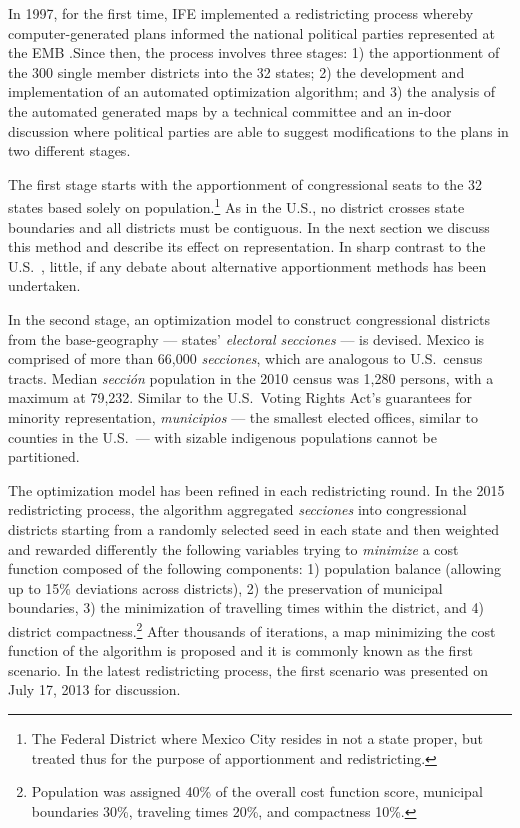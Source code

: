 \documentclass[letter,12pt]{article}
\begin{document}
In 1997, for the first time, IFE implemented a redistricting process whereby computer-generated plans informed the national political parties represented at the EMB \citep{trelles.mtz.tesisItam.2007}.Since then, the process involves three stages: 1) the apportionment of the 300 single member districts into the 32 states; 2) the development and implementation of an automated optimization algorithm; and 3) the analysis of the automated generated maps by a technical committee and an in-door discussion where political parties are able to suggest modifications to the plans in two different stages. 

The first stage starts with the apportionment of congressional seats to the 32 states based solely on population.\footnote{The Federal District where Mexico City resides in not a state proper, but treated thus for the purpose of apportionment and redistricting.} As in the U.S., no district crosses state boundaries and all districts must be contiguous. In the next section we discuss this method and describe its effect on representation. In sharp contrast to the U.S.\ \citep{szpiro.numbersRule.2010}, little, if any debate about alternative apportionment methods has been undertaken. 

In the second stage, an optimization model to construct congressional districts from the base-geography --- states' \emph{electoral \emph{secciones}} --- is devised. Mexico is comprised of more than 66,000 \emph{secciones}, which are analogous to U.S.\ census tracts. Median \emph{secci\'on} population in the 2010 census was 1,280 persons, with a maximum at 79,232. Similar to the U.S.\ Voting Rights Act's guarantees for minority representation, \emph{municipios} --- the smallest elected offices, similar to counties in the U.S.\ --- with sizable indigenous populations cannot be partitioned. 

The optimization model has been refined in each redistricting round. In the 2015 redistricting process, the algorithm aggregated \emph{secciones} into congressional districts starting from a randomly selected seed in each state and then weighted and rewarded differently the following variables trying to \emph{minimize} a cost function composed of the following components: 1) population balance (allowing up to 15\% deviations across districts), 2) the preservation of municipal boundaries, 3) the minimization of travelling times within the district, and 4) district compactness.\footnote{Population was assigned 40\% of the overall cost function score, municipal boundaries 30\%, traveling times 20\%, and  compactness 10\%.} After thousands of iterations, a map minimizing the cost function of the algorithm is proposed and it is commonly known as the first scenario. In the latest redistricting process, the first scenario was presented on July 17, 2013 for discussion.
\end{document}
